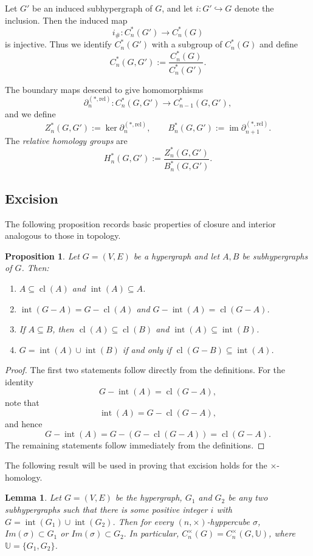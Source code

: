 \documentclass[11pt]{amsart}
\newtheorem{prop}[subsection]{Proposition}
\newtheorem{lem}[subsection]{Lemma}
\newcommand{\cl}{\operatorname{cl}}
\renewcommand{\int}{\operatorname{int}}
\begin{document}
\medskip

Let $G'$ be an induced subhypergraph of $G$, and let $i : G' \hookrightarrow G$ denote the inclusion. Then the induced map
\[
i_\#: C_n^*(G') \to C_n^*(G)
\]
is injective. Thus we identify $C_n^*(G')$ with a subgroup of $C_n^*(G)$ and define
\[
C_n^*(G,G') := \frac{C_n^*(G)}{C_n^*(G')}.
\]

The boundary maps descend to give homomorphisms
\[
\partial_n^{(*,\mathrm{rel})} : C_n^*(G,G') \to C_{n-1}^*(G,G'),
\]
and we define
\[
Z_n^*(G,G') := \ker \partial_n^{(*,\mathrm{rel})}, \qquad
B_n^*(G,G') := \operatorname{im} \partial_{n+1}^{(*,\mathrm{rel})}.
\]
The \emph{relative homology groups} are
\[
H_n^*(G,G') := \frac{Z_n^*(G,G')}{B_n^*(G,G')}.
\]

\subsection{Excision}

The following proposition records basic properties of closure and interior analogous to those in topology.

\begin{prop}\label{prop:closure-interior}
Let $G=(V,E)$ be a hypergraph and let $A,B$ be subhypergraphs of $G$. Then:
\begin{enumerate}
    \item $A \subseteq \cl(A)$ and $\int(A) \subseteq A$.
    \item $\int(G - A) = G - \cl(A)$ and $G - \int(A) = \cl(G - A)$.
    \item If $A \subseteq B$, then $\cl(A) \subseteq \cl(B)$ and $\int(A) \subseteq \int(B)$.
    \item $G = \int(A) \cup \int(B)$ if and only if $\cl(G - B) \subseteq \int(A)$.
\end{enumerate}
\end{prop}

\begin{proof}
The first two statements follow directly from the definitions. For the identity
\[
G - \int(A) = \cl(G - A),
\]
note that
\[
\int(A) = G - \cl(G - A),
\]
and hence
\[
G - \int(A) = G - (G - \cl(G - A)) = \cl(G - A).
\]
The remaining statements follow immediately from the definitions.
\end{proof}

\medskip
The following result will be used in proving that excision holds for the $\times$-homology.

\begin{lem}\label{times hom lem}
Let $G=(V,E)$ be the hypergraph, $G_1$ and $G_2$ be any two subhypergraphs such that there is some positive integer $i$ with  $G=\int(G_1)\cup \int(G_2)$. Then for every $(n,\times)$-hyppercube $\sigma$, $Im(\sigma)\subset G_1$ or $Im(\sigma) \subset G_2.$ In particular, $C_n^\times(G)=C_n^\times( G,\mathbb{U})$, where $\mathbb{U}=\{G_1,G_2\}$.
\end{lem}
\end{document}
